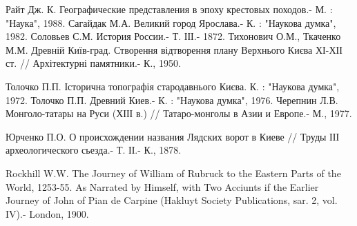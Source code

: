 Райт Дж. К. Географические представления в эпоху крестовых походов.- М. : "Наука", 1988.
Сагайдак М.А. Великий город Ярослава.- К. : "Наукова думка", 1982.
Соловьев С.М. История России.- Т. ІІІ.- 1872.
Тихонович О.М., Ткаченко М.М. Древній Київ-град. Створення відтворення плану Верхнього Києва ХІ-ХІІ ст. // Архітектурні памятники.- К., 1950.

Толочко П.П. Історична топографія стародавнього Києва. К. : "Наукова думка", 1972.
Толочко П.П. Древний Киев.- К. : "Наукова думка", 1976.
Черепнин Л.В. Монголо-татары на Руси (ХІІІ в.) // Татаро-монголы в Азии и Европе.- М., 1977.

Юрченко П.О. О происхождении названия Лядских ворот в Киеве // Труды ІІІ археологического сьезда.- Т. ІІ.- К., 1878.

Rockhill W.W. The Journey of William of Rubruck to the Eastern Parts of the World, 1253-55. As Narrated by Himself, with Two Acciunts if the Earlier Journey of John of Pian de Carpine (Hakluyt Society Publications, sar. 2, vol. IV).- London, 1900.
